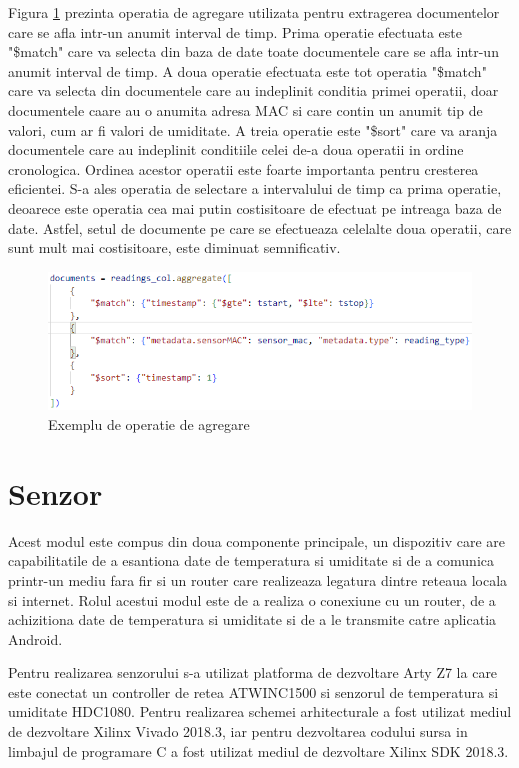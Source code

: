 Figura \ref{fig:PI_AggregationExample} prezinta operatia de agregare utilizata pentru extragerea documentelor care se afla intr-un anumit interval de timp. Prima 
operatie efectuata este "\$match" care va selecta din baza de date toate documentele care se afla intr-un anumit interval de timp. A doua operatie efectuata este 
tot operatia "\$match" care va selecta din documentele care au indeplinit conditia primei operatii, doar documentele caare au o anumita adresa MAC si care contin 
un anumit tip de valori, cum ar fi valori de umiditate. A treia operatie este "\$sort" care va aranja documentele care au indeplinit conditiile celei de-a doua 
operatii in ordine cronologica. Ordinea acestor operatii este foarte importanta pentru cresterea eficientei. S-a ales operatia de selectare a intervalului de timp 
ca prima operatie, deoarece este operatia cea mai putin costisitoare de efectuat pe intreaga baza de date. Astfel, setul de documente pe care se efectueaza celelalte 
doua operatii, care sunt mult mai costisitoare, este diminuat semnificativ.
\begin{figure}[H]
    \centering
    \includegraphics[scale=0.8]{figs/PI_AggregationExample.png}
    \caption{Exemplu de operatie de agregare}
    \label{fig:PI_AggregationExample}
\end{figure}

\section{Senzor}\label{sec:pi_senzor}
Acest modul este compus din doua componente principale, un dispozitiv care are capabilitatile de a esantiona date de temperatura si umiditate si de a comunica 
printr-un mediu fara fir si un router care realizeaza legatura dintre reteaua locala si internet. Rolul acestui modul este de a realiza o conexiune cu un router,
de a achizitiona date de temperatura si umiditate si de a le transmite catre aplicatia Android. 

Pentru realizarea senzorului s-a utilizat platforma de dezvoltare Arty Z7 la care este conectat un controller de retea ATWINC1500 si senzorul de temperatura 
si umiditate HDC1080. Pentru realizarea schemei arhitecturale a fost utilizat mediul de dezvoltare Xilinx Vivado 2018.3, iar pentru dezvoltarea codului sursa 
in limbajul de programare C a fost utilizat mediul de dezvoltare Xilinx SDK 2018.3.

